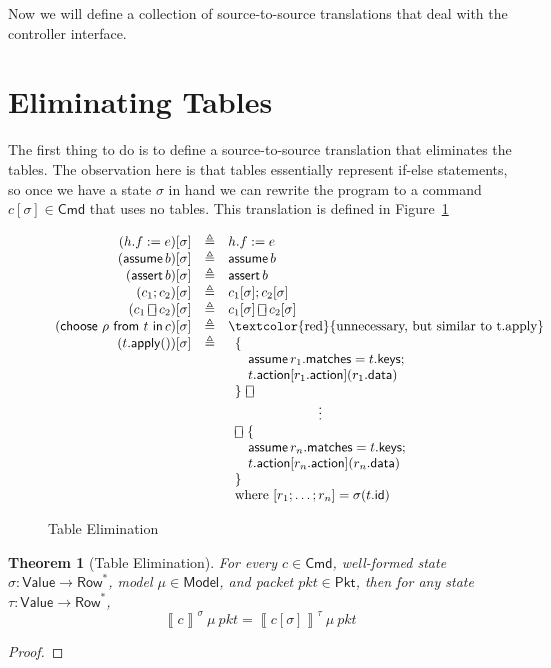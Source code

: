 \documentclass{article}
\newcommand{\pkt}{\mathit{pkt}}
\newcommand{\denote}[1]{\left\llbracket#1\right\rrbracket}
\newcommand{\Value}{\mathsf{Value}}
\newcommand{\Cmd}{\mathsf{Cmd}}
\newcommand{\Pkt}{\mathsf{Pkt}}
\newcommand{\Model}{\mathsf{Model}}
\newcommand{\Row}{\mathsf{Row}}
\newcommand{\matches}{\mathsf{matches}}
\newcommand{\action}{\mathsf{action}}
\newcommand{\keys}{\mathsf{keys}}
\newcommand{\data}{\mathsf{data}}
\newcommand{\id}{\mathsf{id}}
\newcommand{\assert}{\mathop{\mathsf{assert}}}
\newcommand{\assume}{\mathop{\mathsf{assume}}}
\newcommand{\apply}{\mathsf{apply}}
\newcommand{\choiceop}{\rotatebox[origin=c]{90}{$\sqsubset\!\!\!\sqsupset$}}
\newcommand{\choice}{\mathbin{\choiceop}}
\renewcommand{\choose}[2]{\mathop{\mathsf{choose}~#1~\mathsf{from}~#2~\mathsf{in}}}
\newtheorem{theorem}{Theorem}
\begin{document}
Now we will define a collection of source-to-source translations that deal with
the controller interface.

\section{Eliminating Tables}

The first thing to do is to define a source-to-source translation that
eliminates the tables. The observation here is that tables essentially represent
if-else statements, so once we have a state $\sigma$ in hand we can rewrite the
program to a command $c[\sigma] \in \Cmd$ that uses no tables. This translation
is defined in Figure~\ref{fig:table-elim}

\begin{figure}
  \[\begin{array}{r>{\triangleq}cl}
  (h.f := e)[\sigma] && h.f := e   \\
  (\assume b)[\sigma] && \assume b \\
  (\assert b)[\sigma] && \assert b \\
  (c_1;c_2)[\sigma] && c_1[\sigma];c_2[\sigma] \\
  (c_1 \choice c_2)[\sigma] && c_1[\sigma] \choice c_2[\sigma] \\
  (\choose \rho t c)[\sigma] && \textrm{\textcolor{red}{unnecessary, but similar to t.apply}}\\
  (t.\apply())[\sigma] &&
  \begin{array}[t]{l}
    \{\\
    \quad \assume {r_1.\matches = t.\keys};\\
    \quad t.\action[r_1.\action](r_1.\data)\\
    \}~\choice\\
    \multicolumn{1}{c}{\vdots}\\
    \choice~\{\\
    \quad \assume {r_n.\matches = t.\keys};\\
    \quad t.\action[r_n.\action](r_n.\data)\\
    \}\\
    \textrm{where}~[r_1;\ldots;r_n] = \sigma(t.\id)
  \end{array}
  \end{array}
  \]
  \caption{Table Elimination}
  \label{fig:table-elim}
\end{figure}


\begin{theorem}[Table Elimination]
  For every $c \in \Cmd$, well-formed state $\sigma : \Value \to \Row^*$, model
  $\mu \in \Model$, and packet $\pkt \in \Pkt$, then for any state $\tau :
  \Value \to \Row^*$,
  \[\denote{c}^\sigma~\mu~\pkt = \denote{c[\sigma]}^\tau~\mu~\pkt\]
\end{theorem}
\begin{proof}
\end{proof}
\end{document}
